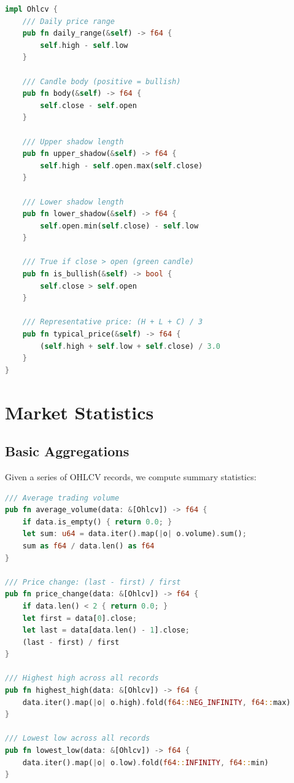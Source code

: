 \begin{lstlisting}[language=Rust]
impl Ohlcv {
    /// Daily price range
    pub fn daily_range(&self) -> f64 {
        self.high - self.low
    }

    /// Candle body (positive = bullish)
    pub fn body(&self) -> f64 {
        self.close - self.open
    }

    /// Upper shadow length
    pub fn upper_shadow(&self) -> f64 {
        self.high - self.open.max(self.close)
    }

    /// Lower shadow length
    pub fn lower_shadow(&self) -> f64 {
        self.open.min(self.close) - self.low
    }

    /// True if close > open (green candle)
    pub fn is_bullish(&self) -> bool {
        self.close > self.open
    }

    /// Representative price: (H + L + C) / 3
    pub fn typical_price(&self) -> f64 {
        (self.high + self.low + self.close) / 3.0
    }
}
\end{lstlisting}

\section{Market Statistics}

\subsection{Basic Aggregations}

Given a series of OHLCV records, we compute summary statistics:

\begin{lstlisting}[language=Rust]
/// Average trading volume
pub fn average_volume(data: &[Ohlcv]) -> f64 {
    if data.is_empty() { return 0.0; }
    let sum: u64 = data.iter().map(|o| o.volume).sum();
    sum as f64 / data.len() as f64
}

/// Price change: (last - first) / first
pub fn price_change(data: &[Ohlcv]) -> f64 {
    if data.len() < 2 { return 0.0; }
    let first = data[0].close;
    let last = data[data.len() - 1].close;
    (last - first) / first
}

/// Highest high across all records
pub fn highest_high(data: &[Ohlcv]) -> f64 {
    data.iter().map(|o| o.high).fold(f64::NEG_INFINITY, f64::max)
}

/// Lowest low across all records
pub fn lowest_low(data: &[Ohlcv]) -> f64 {
    data.iter().map(|o| o.low).fold(f64::INFINITY, f64::min)
}
\end{lstlisting}

